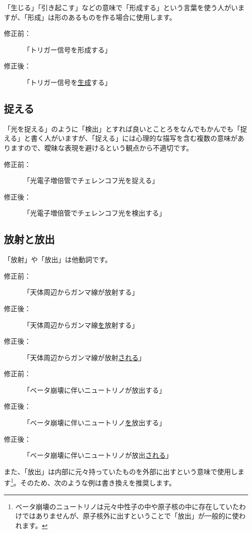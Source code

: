 「生じる」「引き起こす」などの意味で「形成する」という言葉を使う人がいますが、「形成」は形のあるものを作る場合に使用します。

\begin{description}
\item[修正前：]「トリガー信号を形成する」
\item[修正後：]「トリガー信号を\underline{生成}する」
\end{description}

\subsection{捉える}

「光を捉える」のように「検出」とすれば良いとことろをなんでもかんでも「捉える」と書く人がいますが、「捉える」には心理的な描写を含む複数の意味がありますので、曖昧な表現を避けるという観点から不適切です。

\begin{description}
\item[修正前：]「光電子増倍管でチェレンコフ光を捉える」
\item[修正後：]「光電子増倍管でチェレンコフ光を検出する」
\end{description}

\subsection{放射と放出}

「放射」や「放出」は他動詞です。

\begin{description}
\item[修正前：]「天体周辺からガンマ線が放射する」
\item[修正後：]「天体周辺からガンマ線\underline{を}放射する」
\item[修正後：]「天体周辺からガンマ線が放射\underline{される}」
\end{description}

\begin{description}
\item[修正前：]「ベータ崩壊に伴いニュートリノが放出する」
\item[修正後：]「ベータ崩壊に伴いニュートリノ\underline{を}放出する」
\item[修正後：]「ベータ崩壊に伴いニュートリノが放出\underline{される}」
\end{description}

また、「放出」は内部に元々持っていたものを外部に出すという意味で使用します\footnote{ベータ崩壊のニュートリノは元々中性子の中や原子核の中に存在していたわけではありませんが、原子核外に出すということで「放出」が一般的に使われます。}。そのため、次のような例は書き換えを推奨します。

